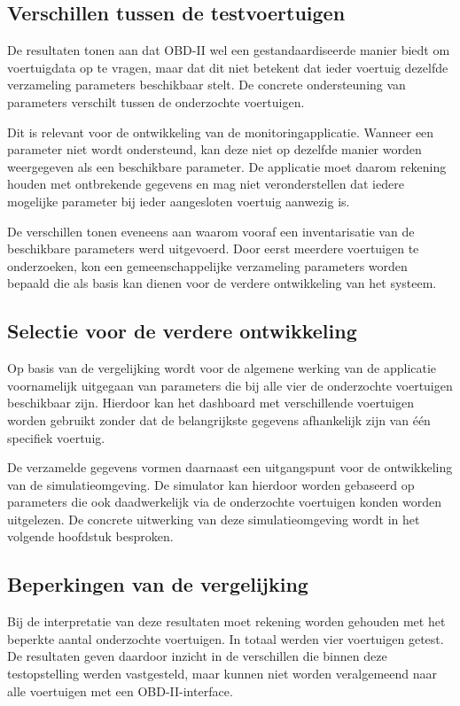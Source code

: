 \subsection{Verschillen tussen de testvoertuigen}
De resultaten tonen aan dat OBD-II wel een gestandaardiseerde manier biedt om
voertuigdata op te vragen, maar dat dit niet betekent dat ieder voertuig
dezelfde verzameling parameters beschikbaar stelt. De concrete ondersteuning
van parameters verschilt tussen de onderzochte voertuigen.

Dit is relevant voor de ontwikkeling van de monitoringapplicatie. Wanneer een
parameter niet wordt ondersteund, kan deze niet op dezelfde manier worden
weergegeven als een beschikbare parameter. De applicatie moet daarom rekening
houden met ontbrekende gegevens en mag niet veronderstellen dat iedere
mogelijke parameter bij ieder aangesloten voertuig aanwezig is.

De verschillen tonen eveneens aan waarom vooraf een inventarisatie van de
beschikbare parameters werd uitgevoerd. Door eerst meerdere voertuigen te
onderzoeken, kon een gemeenschappelijke verzameling parameters worden bepaald
die als basis kan dienen voor de verdere ontwikkeling van het systeem.

\subsection{Selectie voor de verdere ontwikkeling}
Op basis van de vergelijking wordt voor de algemene werking van de applicatie
voornamelijk uitgegaan van parameters die bij alle vier de onderzochte
voertuigen beschikbaar zijn. Hierdoor kan het dashboard met verschillende
voertuigen worden gebruikt zonder dat de belangrijkste gegevens afhankelijk
zijn van één specifiek voertuig.

De verzamelde gegevens vormen daarnaast een uitgangspunt voor de ontwikkeling
van de simulatieomgeving. De simulator kan hierdoor worden gebaseerd op
parameters die ook daadwerkelijk via de onderzochte voertuigen konden worden
uitgelezen. De concrete uitwerking van deze simulatieomgeving wordt in het
volgende hoofdstuk besproken.

\subsection{Beperkingen van de vergelijking}
Bij de interpretatie van deze resultaten moet rekening worden gehouden met het
beperkte aantal onderzochte voertuigen. In totaal werden vier voertuigen
getest. De resultaten geven daardoor inzicht in de verschillen die binnen deze
testopstelling werden vastgesteld, maar kunnen niet worden veralgemeend naar
alle voertuigen met een OBD-II-interface.

